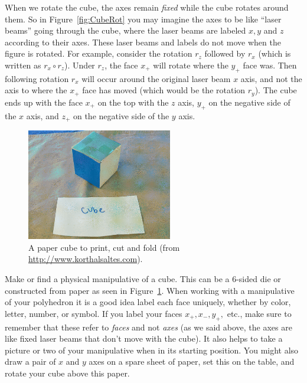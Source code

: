 \begin{rem} When we rotate the cube, the axes remain \emph{fixed} while the cube rotates around them.  So in Figure~\ref{fig:CubeRot} you may imagine the axes to be like ``laser beams'' going through the cube, where the laser beams are labeled $x, y$ and $z$ according to their axes. These laser beams and labels do not move when the figure is rotated. For example, consider the rotation $r_z$ followed by $r_x$ (which is written as $r_x\circ r_z$). Under $r_z$, the face $x_+$ will rotate where the $y_+$ face was. Then following rotation $r_x$ will occur around the original laser beam $x$ axis, and not the axis to where the $x_+$ face has moved (which would be the rotation $r_y$). The cube ends up with the face $x_+$ on the top with the $z$ axis, $y_+$ on the negative side of the $x$ axis, and $z_+$ on the negative side of the $y$ axis.
\end{rem}

\begin{figure}[ht]
\begin{center}
\includegraphics[width=2.5in]{images/CubeFold.png}
\caption[caption]{A paper cube to print, cut and fold 
(from \url{http://www.korthalsaltes.com}).}
 \label{fig:CubeFold}
\end{center}
\end{figure}

\begin{rem} Make or find a physical manipulative of a cube. This can be a 6-sided die or constructed from paper as seen in Figure~\ref{fig:CubeFold}. When working with a manipulative of your polyhedron it is a good idea label each face uniquely, whether by color, letter, number, or symbol. If you label your faces $x_+, x_-, y_+,$ etc., make sure to remember that these refer to \emph{faces} and not \emph{axes} (as we said above, the axes are like fixed laser beams that don't move with the cube).  It also helps to take a picture or two of your manipulative when in its starting position. You might also draw a pair of $x$ and $y$ axes on a spare sheet of paper, set this on the table, and rotate your cube above this paper.
\end{rem}

